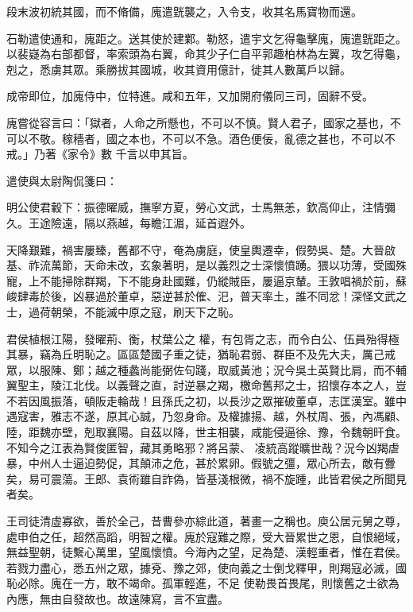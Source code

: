 \begin{pinyinscope}
 段末波初統其國，而不脩備，廆遣皝襲之，入令支，收其名馬寶物而還。



 石勒遣使通和，廆距之。送其使於建鄴。勒怒，遣宇文乞得龜擊廆，廆遣皝距之。以裴嶷為右部都督，率索頭為右翼，命其少子仁自平郭趣柏林為左翼，攻乞得龜，剋之，悉虜其眾。乘勝拔其國城，收其資用億計，徙其人數萬戶以歸。



 成帝即位，加廆侍中，位特進。咸和五年，又加開府儀同三司，固辭不受。



 廆嘗從容言曰：「獄者，人命之所懸也，不可以不慎。賢人君子，國家之基也，不可以不敬。稼穡者，國之本也，不可以不急。酒色便佞，亂德之甚也，不可以不戒。」乃著《家令》數
 千言以申其旨。



 遣使與太尉陶侃箋曰：



 明公使君轂下：振德曜威，撫寧方夏，勞心文武，士馬無恙，欽高仰止，注情彌久。王途險遠，隔以燕越，每瞻江湄，延首遐外。



 天降艱難，禍害屢臻，舊都不守，奄為虜庭，使皇輿遷幸，假勢吳、楚。大晉啟基、祚流萬節，天命未改，玄象著明，是以義烈之士深懷憤踴。猥以功薄，受國殊寵，上不能掃除群羯，下不能身赴國難，仍縱賊臣，屢逼京輦。王敦唱禍於前，蘇峻肆毒於後，凶暴過於董卓，惡逆甚於傕、汜，普天率土，誰不同忿！深怪文武之士，過荷朝榮，不能滅中原之寇，刷天下之恥。



 君侯植根江陽，發曜荊、衡，杖葉公之
 權，有包胥之志，而令白公、伍員殆得極其暴，竊為丘明恥之。區區楚國子重之徒，猶恥君弱、群臣不及先大夫，厲己戒眾，以服陳、鄭；越之種蠡尚能弼佐句踐，取威黃池；況今吳土英賢比肩，而不輔翼聖主，陵江北伐。以義聲之直，討逆暴之羯，檄命舊邦之士，招懷存本之人，豈不若因風振落，頓阪走輪哉！且孫氏之初，以長沙之眾摧破董卓，志匡漢室。雖中遇寇害，雅志不遂，原其心誠，乃忽身命。及權據揚、越，外杖周、張，內馮顧、陸，距魏亦壁，剋取襄陽。自茲以降，世主相襲，咸能侵逼徐、豫，令魏朝旰食。不知今之江表為賢俊匿智，藏其勇略邪？將呂蒙、
 凌統高蹤曠世哉？況今凶羯虐暴，中州人士逼迫勢促，其顛沛之危，甚於累卵。假號之彊，眾心所去，敵有釁矣，易可震蕩。王郎、袁術雖自詐偽，皆基淺根微，禍不旋踵，此皆君侯之所聞見者矣。



 王司徒清虛寡欲，善於全己，昔曹參亦綜此道，著畫一之稱也。庾公居元舅之尊，處申伯之任，超然高蹈，明智之權。廆於寇難之際，受大晉累世之恩，自恨絕域，無益聖朝，徒繫心萬里，望風懷憤。今海內之望，足為楚、漢輕重者，惟在君侯。若戮力盡心，悉五州之眾，據兗、豫之郊，使向義之士倒戈釋甲，則羯寇必滅，國恥必除。廆在一方，敢不竭命。孤軍輕進，不足
 使勒畏首畏尾，則懷舊之士欲為內應，無由自發故也。故遠陳寫，言不宣盡。




\end{pinyinscope}

